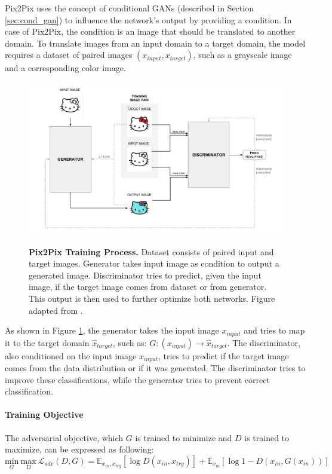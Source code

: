 \documentclass[12pt]{report}
\begin{document}
Pix2Pix uses the concept of conditional GANs \cite{mirza_conditional_2014} (described in Section \ref{sec:cond_gan}) to influence the network's output by providing a condition. In case of Pix2Pix, the condition is an image that should be translated to another domain. To translate images from an input domain to a target domain, the model requires a dataset of paired images $(x_{input}, x_{target})$, such as a grayscale image and a corresponding color image. 


\begin{figure}[h]
\centering
{\includegraphics[width=\linewidth]{03_analysis/gans/pix2pix}}
\caption{\label{fig:pix2pix} \textbf{Pix2Pix Training Process.} Dataset consists of paired input and target images. Generator takes input image as condition to output a generated image. Discriminator tries to predict, given the input image, if the target image comes from dataset or from generator. This output is then used to further optimize both networks. Figure adapted from \cite{hesse_image--image_2017}.}
\end{figure}

As shown in Figure \ref{fig:pix2pix}, the generator takes the input image $x_{input}$ and tries to map it to the target domain $\hat{x}_{target}$, such as: $G: (x_{input}) \rightarrow \hat{x}_{target}$. The discriminator, also conditioned on the input image $x_{input}$, tries to predict if the target image comes from the data distribution or if it was generated. The discriminator tries to improve these classifications, while the generator tries to prevent correct classification.


\paragraph{Training Objective}
The adversarial objective, which $G$ is trained to minimize and $D$ is trained to maximize, can be expressed as following:
\begin{equation}
\underset{G}{\mathrm{min}} \ \underset{D}{\mathrm{max}} \ \mathcal{L}_{adv}(D,G) = \mathbb{E}_{x_{in},x_{trg}}[\log D(x_{in},x_{trg})] + \mathbb{E}_{x_{in}}[\log 1 - D(x_{in}, G(x_{in}))]
\label{eq:pix2pix_minimax_cond}
\end{equation}
\end{document}

